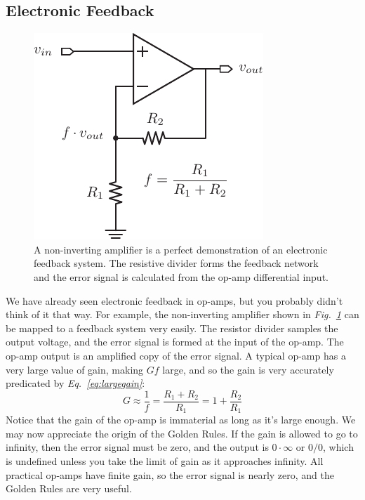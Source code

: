 \subsection{Electronic Feedback}
\begin{figure}[tb]
\centering
\includegraphics[scale=1]{opamp_fb}
\caption{A non-inverting amplifier is a perfect demonstration of an electronic feedback system.  The resistive divider forms the feedback network and the error signal is calculated from the op-amp differential input.}
\label{fig:opamp_fb}
\end{figure}
We have already seen electronic feedback in op-amps, but you probably didn't think of it that way.  For example, the non-inverting amplifier shown in \emph{Fig.~\ref{fig:opamp_fb}} can be mapped to a feedback system very easily.  The resistor divider samples the output voltage, and the error signal is formed at the input of the op-amp.  The op-amp output is an amplified copy of the error signal.  A typical op-amp has a very large value of gain, making $G f$ large, and so the gain is very accurately predicated by \emph{Eq.~\ref{eq:largegain}}:
    \begin{equation}
        G \approx \frac{1}{f} = \frac{R_1 + R_2}{R_1} = 1 + \frac{R_2}{R_1}
    \end{equation}
Notice that the gain of the op-amp is immaterial as long as it's large enough.  We may now appreciate the origin of the Golden Rules.  If the gain is allowed to go to infinity, then the error signal must be zero, and the output is $0 \cdot \infty$ or $0/0$, which is undefined unless you take the limit of gain as it approaches infinity.  All practical op-amps have finite gain, so the error signal is nearly zero, and the Golden Rules are very useful.  
